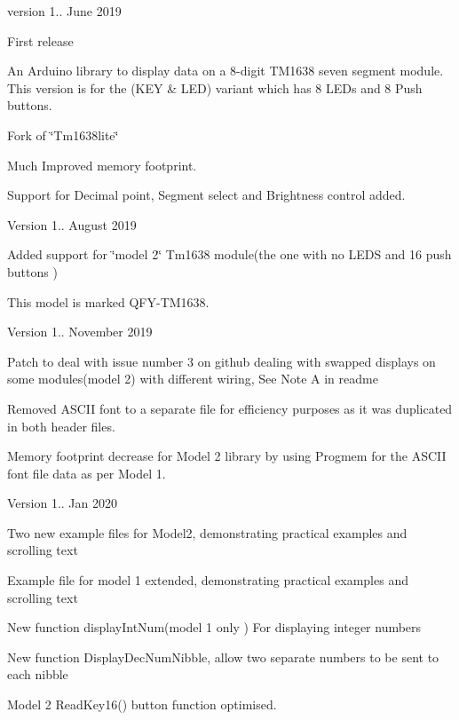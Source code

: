 
\begin{DoxyItemize}
\item version 1.. June 2019
\begin{DoxyItemize}
\item First release
\item An Arduino library to display data on a 8-\/digit TM1638 seven segment module. This version is for the (KEY \& LED) variant which has 8 LED\textquotesingle{}s and 8 Push buttons.
\item Fork of \char`\"{}\+Tm1638lite\char`\"{}
\item Much Improved memory footprint.
\item Support for Decimal point, Segment select and Brightness control added.
\end{DoxyItemize}
\item Version 1.. August 2019
\begin{DoxyItemize}
\item Added support for \char`\"{}model 2\char`\"{} Tm1638 module(the one with no LEDS and 16 push buttons )
\item This model is marked QFY-\/\+TM1638.
\end{DoxyItemize}
\item Version 1.. November 2019
\begin{DoxyItemize}
\item Patch to deal with issue number 3 on github dealing with swapped displays on some modules(model 2) with different wiring, See Note A in readme
\item Removed ASCII font to a separate file for efficiency purposes as it was duplicated in both header files.
\item Memory footprint decrease for Model 2 library by using Progmem for the ASCII font file data as per Model 1.
\end{DoxyItemize}
\item Version 1.. Jan 2020
\begin{DoxyItemize}
\item Two new example files for Model2, demonstrating practical examples and scrolling text
\item Example file for model 1 extended, demonstrating practical examples and scrolling text
\item New function display\+Int\+Num(model 1 only ) For displaying integer numbers
\item New function Display\+Dec\+Num\+Nibble, allow two separate numbers to be sent to each nibble
\item Model 2 Read\+Key16() button function optimised.

\end{DoxyItemize}
\end{DoxyItemize}
